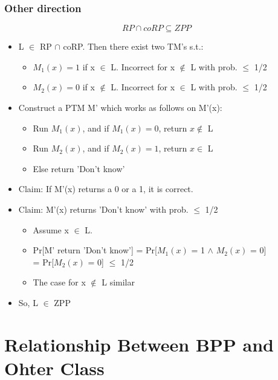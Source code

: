 \documentclass{beamer}
\begin{document}
\begin{frame}
\frametitle{Other direction}
$$
RP \cap coRP \subseteq ZPP
$$
\begin{itemize}
	\item L $\in$ RP $\cap$ coRP. Then there exist two TM's s.t.:
	\begin{itemize}
		\item $M_{1}(x) = 1$ if x $\in$ L. Incorrect for x $\notin$ L with prob. $\leq$ 1/2
		\item $M_{2}(x) = 0$ if x $\notin$ L. Incorrect for x $\in$ L with prob. $\leq$ 1/2
	\end{itemize}
	\item Construct a PTM M' which works as follows on M'(x):
	\begin{itemize}
		\item Run $M_{1}(x)$, and if $M_{1}(x) = 0$, return $x \notin$ L
		\item Run $M_{2}(x)$, and if $M_{2}(x) = 1$, return $x \in$ L
		\item Else return 'Don't know'
	\end{itemize}
	\item {\color{red} Claim}: If M'(x) returns a 0 or a 1, it is correct.

	\item {\color{red} Claim}: M'(x) returns 'Don't know' with prob. $\leq$ 1/2
	\begin{itemize}
		\item Assume x $\in$ L. 
		\item Pr[M' return 'Don't know'] = Pr[$M_{1}(x)$ = 1 $\land$ $M_{2}(x)$ = 0] \\
		= Pr[$M_{2}(x)$ = 0] $\leq$ 1/2
		\item The case for x $\notin$ L similar 
	\end{itemize}
	\item So, L $\in$ ZPP
\end{itemize}
\end{frame}

\section{Relationship Between BPP and Ohter Class}
\end{document}
